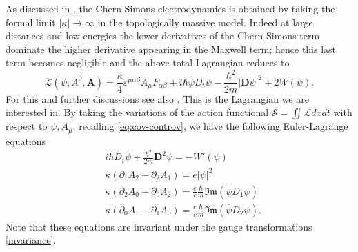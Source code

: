 \documentclass[11pt,leqno,twoside,reqno]{amsart}
\numberwithin{equation}{section}
\begin{document}
As discussed in \cite{JP1}, the Chern-Simons electrodynamics
is obtained by taking the formal limit $|\kappa|\to \infty$ in the topologically massive model.
Indeed at large distances and low energies the lower derivatives
of the Chern-Simons term dominate the higher derivative appearing in the Maxwell term; hence this last 
term becomes negligible and the above total Lagrangian reduces to
\begin{equation*} 
\mathcal L (\psi,A^0,\mathbf{A})
=  \frac{\kappa}{4}\varepsilon^{\mu\alpha\beta}A_{\mu}F_{\alpha\beta}
+i \hbar \overline \psi  D_{t}\psi -\frac{\hbar^{2}}{2m} |\mathbf D \psi|^{2}+2W(\psi).
\end{equation*}
For this and further discussions see also  \cite{DJT,Ha,JP2,Sc,Tar}. This is the Lagrangian we are interested in.
By taking the variations of the action functional 
$\mathcal S=\iint \mathcal L dx dt$ with respect to $\psi,A_{\mu}$, recalling \eqref{eq:cov-controv}, we have the following Euler-Lagrange equations
\begin{equation}\label{EL}
\begin{split}
& i\hbar D_{t} \psi+\frac{\hbar^{2}}{2m} \mathbf D^{2}\psi =- W'(\psi)\\ 
& \kappa(\partial_{1}A_{2}-\partial_{2}A_{1})=e |\psi|^{2}\\ 
&\kappa(\partial_{2}A_{0}-\partial_{0}A_{2})= \frac{e}{c}\frac{\hbar}{m}\mathfrak{Im} ( \overline\psi D_{1} \psi)\\ 
&\kappa(\partial_{0}A_{1}-\partial_{1}A_{0})= \frac{e}{c}\frac{\hbar}{m}\mathfrak{Im} ( \overline\psi D_{2} \psi). 
\end{split}
\end{equation}
Note that these equations are invariant under the gauge transformations \eqref{invariance}.
\end{document}
